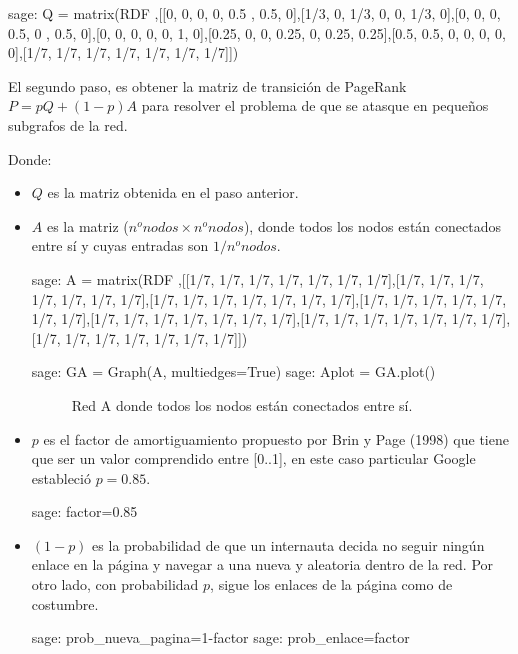 \begin{sagecommandline}
    sage: Q = matrix(RDF ,[[0, 0, 0, 0, 0.5 , 0.5, 0],[1/3, 0, 1/3, 0, 0, 1/3, 0],[0, 0, 0, 0.5, 0 , 0.5, 0],[0, 0, 0, 0, 0, 1, 0],[0.25, 0, 0, 0.25, 0, 0.25, 0.25],[0.5, 0.5, 0, 0, 0, 0, 0],[1/7, 1/7, 1/7, 1/7, 1/7, 1/7, 1/7]])
\end{sagecommandline}

\par El segundo paso, es obtener la matriz de transición de PageRank $P=pQ + (1-p)A$ para resolver el 
problema de que se atasque en pequeños subgrafos de la red.
\par Donde:
\begin{itemize}
    \item $Q$ es la matriz obtenida en el paso anterior.
    \item $A$ es la matriz ($n^onodos \times n^onodos$), donde todos los nodos están conectados entre sí y cuyas 
    entradas son $1/n^o nodos$.
    \begin{sagecommandline}
        sage: A = matrix(RDF ,[[1/7, 1/7, 1/7, 1/7, 1/7, 1/7, 1/7],[1/7, 1/7, 1/7, 1/7, 1/7, 1/7, 1/7],[1/7, 1/7, 1/7, 1/7, 1/7, 1/7, 1/7],[1/7, 1/7, 1/7, 1/7, 1/7, 1/7, 1/7],[1/7, 1/7, 1/7, 1/7, 1/7, 1/7, 1/7],[1/7, 1/7, 1/7, 1/7, 1/7, 1/7, 1/7],[1/7, 1/7, 1/7, 1/7, 1/7, 1/7, 1/7]])
    \end{sagecommandline} 
    \begin{sagecommandline}
        sage: GA = Graph(A, multiedges=True)
        sage: Aplot = GA.plot()
    \end{sagecommandline}
    
    \begin{figure}[H]
        \centering
        \label{redA}
        \caption{Red A donde todos los nodos están conectados entre sí.}
    \end{figure}
    \item $p$ es el factor de amortiguamiento propuesto por Brin y Page (1998) que tiene que ser un valor 
    comprendido entre [0..1], en este caso particular Google estableció $p=0.85$.
    \begin{sagecommandline}
        sage: factor=0.85
    \end{sagecommandline}
    \item  $(1-p)$ es la probabilidad de que un internauta decida no seguir ningún enlace en la página y 
    navegar a una nueva y aleatoria dentro de la red. Por otro lado, con probabilidad $p$, sigue los enlaces de 
    la página como de costumbre.
    \begin{sagecommandline}
        sage: prob_nueva_pagina=1-factor
        sage: prob_enlace=factor
    \end{sagecommandline}
\end{itemize}

